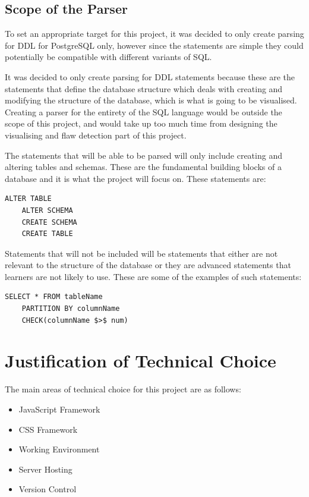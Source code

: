 \subsection{Scope of the Parser}

To set an appropriate target for this project, it was decided to only create parsing for DDL for PostgreSQL only, however since the statements are simple they could potentially be compatible with different variants of SQL. 

It was decided to only create parsing for DDL statements because these are the statements that define the database structure which deals with creating and modifying the structure of the database, which is what is going to be visualised. Creating a parser for the entirety of the SQL language would be outside the scope of this project, and would take up too much time from designing the visualising and flaw detection part of this project.

The statements that will be able to be parsed will only include creating and altering tables and schemas. These are the fundamental building blocks of a database and it is what the project will focus on. These statements are:

\begin{lstlisting}[style=JavaScript, caption={}]
	ALTER TABLE
	ALTER SCHEMA
	CREATE SCHEMA
	CREATE TABLE
\end{lstlisting}

Statements that will not be included will be statements that either are not relevant to the structure of the database or they are advanced statements that learners are not likely to use. These are some of the examples of such statements:

\begin{lstlisting}[style=JavaScript, caption={}]
	SELECT * FROM tableName
	PARTITION BY columnName
	CHECK(columnName $>$ num)
\end{lstlisting}

\newpage

\section{Justification of Technical Choice}

The main areas of technical choice for this project are as follows:

\begin{itemize}
	\item JavaScript Framework
	\item CSS Framework
	\item Working Environment
	\item Server Hosting
	\item Version Control
\end{itemize}

